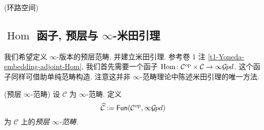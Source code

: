 \begin{definition}
	{(环路空间)}
	
\end{definition}


\subsection{$\operatorname{Hom}$ 函子, 预层与 $\infty$-米田引理}


我们希望定义 $\infty$-版本的预层范畴, 并建立米田引理. 参考卷 1 注 \ref{t1-Yoneda-embedding-adjoint-Hom}, 我们首先需要一个函子 $\operatorname{Hom}\colon \mathcal C^{\text{op}}\times\mathcal C\to {\infty\mathcal {G}\hspace{-1pt}pd}$. 这个函子同样可借助单纯范畴构造. 注意这并非 $\infty$-范畴理论中陈述米田引理的唯一方法.


\begin{definition}
	{(预层 $\infty$-范畴)}
	设 $\mathcal C$ 为 $\infty$-范畴. 定义 $$\widehat {\mathcal C} := \mathsf {Fun}(\mathcal C^{\text{op}},{\infty\mathcal {G}\hspace{-1pt}pd})$$
	为 $\mathcal C$ 上的\emph{预层 $\infty$-范畴}.
\end{definition}

\begin{prop}
	{}
	
\end{prop}








\todo{}

%
%
